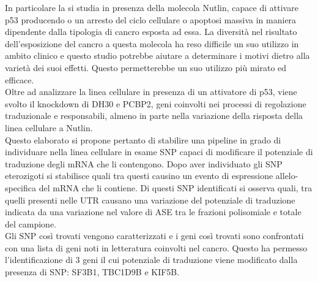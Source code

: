In particolare la si studia in presenza della molecola Nutlin, capace di attivare p53 producendo o un arresto del ciclo cellulare o apoptosi massiva in maniera dipendente dalla tipologia di cancro esposta ad essa.
La diversit\`a nel risultato dell'esposizione del cancro a questa molecola ha reso difficile un suo utilizzo in ambito clinico e questo studio potrebbe aiutare a determinare i motivi dietro alla variet\`a dei suoi effetti.
Questo permetterebbe un suo utilizzo pi\`u mirato ed efficace.\\
Oltre ad analizzare la linea cellulare in presenza di un attivatore di p53, viene svolto il knockdown di DH30 e PCBP2, geni coinvolti nei processi di regolazione traduzionale e responsabili, almeno in parte nella variazione della risposta della linea cellulare a Nutlin.\\[12pt]
Questo elaborato si propone pertanto di stabilire una pipeline in grado di individuare nella linea cellulare in esame SNP capaci di modificare il potenziale di traduzione degli mRNA che li contengono.
Dopo aver individuato gli SNP eterozigoti si stabilisce quali tra questi causino un evento di espressione allelo-specifica del mRNA che li contiene.
Di questi SNP identificati si osserva quali, tra quelli presenti nelle UTR causano una variazione del potenziale di traduzione indicata da una variazione nel valore di ASE tra le frazioni polisomiale e totale del campione.\\
Gli SNP cos\`i trovati vengono caratterizzati e i geni cos\`i trovati sono confrontati con una lista di geni noti in letteratura coinvolti nel cancro.
Questo ha permesso l'identificazione di $3$ geni il cui potenziale di traduzione viene modificato dalla presenza di SNP: SF3B1, TBC1D9B e KIF5B.


%
